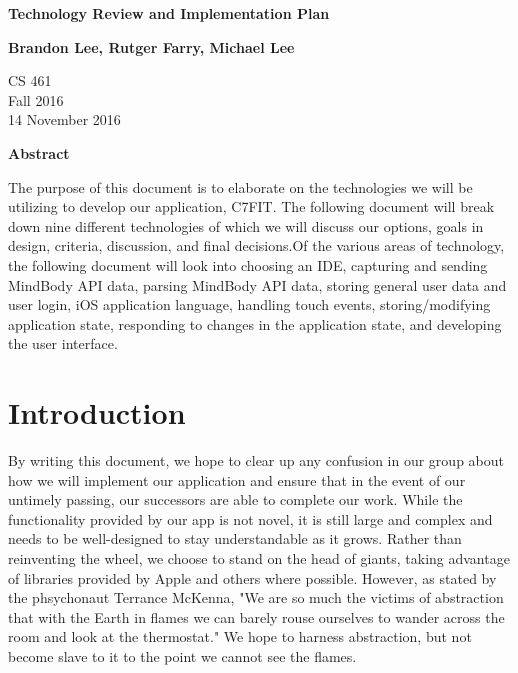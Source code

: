 \documentclass[letterpaper,10pt,titlepage]{article}
\begin{document}
\begin{titlepage}
    \begin{center}
        \vspace*{3.5cm}

        \textbf{Technology Review and Implementation Plan}

        \vspace{0.5cm}

        \textbf{Brandon Lee, Rutger Farry, Michael Lee}

        \vspace{0.8cm}

        CS 461\\
        Fall 2016\\
        14 November 2016\\

        \vspace{1cm}

        \textbf{Abstract}\\

        \vspace{0.5cm}

        The purpose of this document is to elaborate on the technologies we will be utilizing to develop our application, C7FIT. The following document will break down nine different technologies of which we will discuss our options, goals in design, criteria, discussion, and final decisions.Of the various areas of technology, the following document will look into choosing an IDE, capturing and sending MindBody API data, parsing MindBody API data, storing general user data and user login, iOS application language, handling touch events, storing/modifying application state, responding to changes in the application state, and developing the user interface.

        \vfill

    \end{center}
\end{titlepage}

\newpage

\tableofcontents

\newpage

\section{Introduction}
By writing this document, we hope to clear up any confusion in our group about how we will implement our application and ensure that in the event of our untimely passing, our successors are able to complete our work. While the functionality provided by our app is not novel, it is still large and complex and needs to be well-designed to stay understandable as it grows. Rather than reinventing the wheel, we choose to stand on the head of giants, taking advantage of libraries provided by Apple and others where possible. However, as stated by the phsychonaut  Terrance McKenna, "We are so much the victims of abstraction that with the Earth in flames we can barely rouse ourselves to wander across the room and look at the thermostat." We hope to harness abstraction, but not become slave to it to the point we cannot see the flames.
\end{document}
